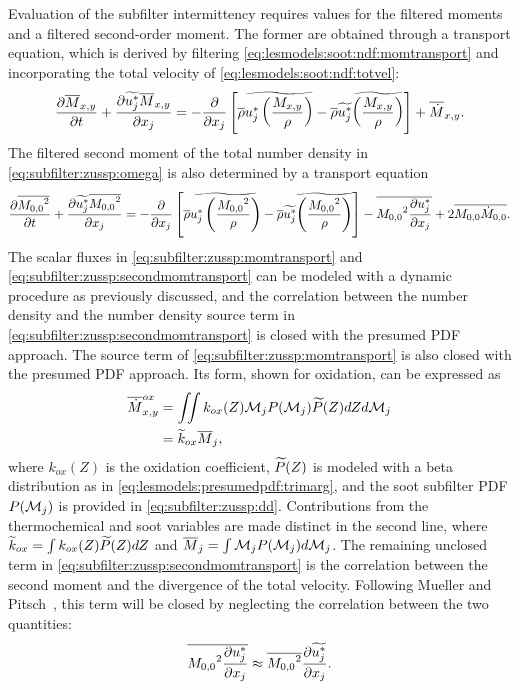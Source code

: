 Evaluation of the subfilter intermittency requires values for the filtered moments and a filtered second-order moment. The former are obtained through a transport equation, which is derived by filtering \cref{eq:lesmodels:soot:ndf:momtransport} and incorporating the total velocity of \cref{eq:lesmodels:soot:ndf:totvel}:
\begin{equation}\label{eq:subfilter:zussp:momtransport}
  \pder[\mean{M}_{x,y}]{t} + \pder[\tf{u_j^*}\mean{M}_{x,y}]{x_j} = -\pder[]{x_j}\left[ \mean{\rho}\tf{u_j^* \left( \frac{M_{x,y}}{\rho}\right)} - \mean{\rho}\tf{u_j^*}\tf{ \left( \frac{M_{x,y}}{\rho} \right)} \right] + \fst[M]{x,y}.
\end{equation}
The filtered second moment of the total number density in \cref{eq:subfilter:zussp:omega} is also determined by a transport equation
\begin{equation}\label{eq:subfilter:zussp:secondmomtransport}
  \pder[\mean{{M_{0,0}}^2}]{t} + \pder[\tf{u_j^*}\mean{{M_{0,0}}^2}]{x_j} = -\pder[]{x_j}\left[ \mean{\rho}\tf{u_j^* \left( \frac{{M_{0,0}}^2}{\rho} \right)} - \mean{\rho}\tf{u_j^*}\tf{\left( \frac{{M_{0,0}}^2}{\rho} \right)} \right] - \mean{{M_{0,0}}^2 \pder[u_j^*]{x_j}} + 2\mean{M_{0,0}\dot{M}_{0,0}}.
\end{equation}
The scalar fluxes in \cref{eq:subfilter:zussp:momtransport} and \cref{eq:subfilter:zussp:secondmomtransport} can be modeled with a dynamic procedure as previously discussed, and the correlation between the number density and the number density source term in \cref{eq:subfilter:zussp:secondmomtransport} is closed with the presumed PDF approach. The source term of \cref{eq:subfilter:zussp:momtransport} is also closed with the presumed PDF approach. Its form, shown for oxidation, can be expressed as
\begin{equation}\label{eq:subfilter:zussp:ox}
  \begin{split}
    \fst[M]{x,y}^{ox} &= \iint k_{ox}(Z)\mc{M}_j P(\mc{M}_j)\pz dZ d\mc{M}_j \\
    &= \tf{k}_{ox}\mean{M}_j,
  \end{split}
\end{equation}
where $k_{ox}(Z)$ is the oxidation coefficient, $\pz$ is modeled with a beta distribution as in \cref{eq:lesmodels:presumedpdf:trimarg}, and the soot subfilter PDF $P(\mc{M}_j)$ is provided in \cref{eq:subfilter:zussp:dd}. Contributions from the thermochemical and soot variables are made distinct in the second line, where $\tf{k}_{ox} = \int k_{ox}(Z)\pz dZ$ and $\mean{M}_j = \int \mc{M}_j P(\mc{M}_j)d\mc{M}_j$. The remaining unclosed term in \cref{eq:subfilter:zussp:secondmomtransport} is the correlation between the second moment and the divergence of the total velocity. Following Mueller and Pitsch~\cite{subfilterpdf2011}, this term will be closed by neglecting the correlation between the two quantities:
\begin{equation}\label{eq:subfilter:zussp:nocorrelation}
  \mean{{M_{0,0}}^2 \pder[u_j^*]{x_j}} \approx \mean{{M_{0,0}}^2}\pder[\tf{u_j^*}]{x_j}.
\end{equation}
